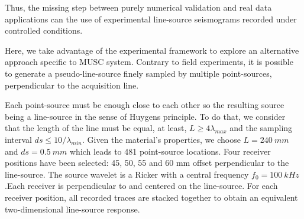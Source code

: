 \documentclass[manuscript,revised]{geophysics}
\newcommand{\twod}{two-dimensional }
\newcommand{\thrd}{three-dimensional }
\begin{document}
\noindent Thus, the missing step between purely numerical validation and real data applications can the use of experimental line-source seismograms recorded under controlled conditions.


\noindent Here, we take advantage of the experimental framework to explore an alternative approach specific to MUSC system. Contrary to field experiments, it is possible to generate a pseudo-line-source finely sampled by multiple point-sources, perpendicular to the acquisition line. 

\noindent Each point-source must be enough close to each other so the resulting source being a line-source in the sense of Huygens principle. To do that, we consider that the length of the line must be equal, at least, $L \geq 4\lambda_{max}$ and the sampling interval $ds \leq 10 / \lambda_{min}$. Given the material's properties, we choose $L=240\ mm$ and $ds=0.5\ mm$ which leads to 481 point-source locations. Four receiver positions have been selected: 45, 50, 55 and 60 mm offset perpendicular to the line-source. The source wavelet is a Ricker with a central frequency $f_{0}=100\ kHz$.Each receiver is perpendicular to and centered on the line-source. For each receiver position, all recorded traces are stacked together to obtain an equivalent two-dimensional line-source response.

\end{document}
